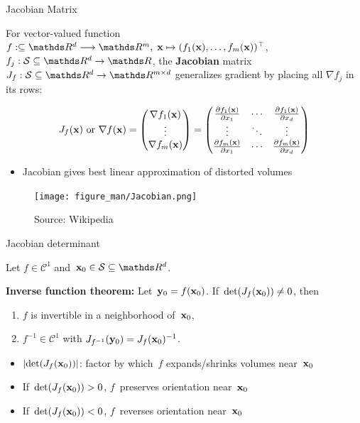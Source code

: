\documentclass[11pt,compress,t,notes=noshow, xcolor=table]{beamer}
\begin{document}
\begin{vbframe}{Jacobian Matrix}

For vector-valued function~$f:\subseteq \R^d\longrightarrow\R^m,\; \xv\mapsto(f_1(\xv),\dots,f_m(\xv))^\top$, $f_j:\mathcal{S}\subseteq \R^d\to\R$, the \textbf{Jacobian} matrix $J_f:\mathcal{S}\subseteq \R^d \to \R^{m\times d}$ generalizes gradient by placing all $\nabla f_j$ in its rows:

\begin{equation*}
    J_f(\mathbf{x}) \text{ or } \nabla f(\mathbf{x}) = \begin{pmatrix}
        \nabla f_1(\mathbf{x}) \\
        \vdots \\
        \nabla f_m(\mathbf{x})
	\end{pmatrix}
    =
    \begin{pmatrix}
        \frac{\partial f_1(\mathbf{x})}{\partial x_1} & \cdots & \frac{\partial f_1(\mathbf{x})}{\partial x_d} \\
        \vdots &  \ddots & \vdots \\
        \frac{\partial f_m(\mathbf{x})}{\partial x_1} & \cdots & \frac{\partial f_m(\mathbf{x})}{\partial x_d}
	\end{pmatrix}
\end{equation*}

\begin{itemize}
    \item Jacobian gives best linear approximation of distorted volumes
\end{itemize}

\begin{figure}
    \centering
    \texttt{[image: figure\_man/Jacobian.png]}
    \caption*{\footnotesize Source: Wikipedia}
\end{figure}

\end{vbframe}


\begin{vbframe}{Jacobian determinant}

Let $f\in\mathcal{C}^1$ and~$\xv_0\in\mathcal{S}\subseteq \R^d$.


\textbf{Inverse function theorem:} Let~$\mathbf{y}_0=f(\mathbf{x}_0)$.
    If~$\det(J_f(\mathbf{x}_0))\not=0$, then
    \begin{enumerate}
        \item $f$ is invertible in a neighborhood of~$\mathbf{x}_0$,
        \item $f^{-1}\in\mathcal{C}^1$ with $J_{f^{-1}}(\mathbf{y}_0) = J_f(\mathbf{x}_0)^{-1}$.
    \end{enumerate}


\begin{itemize}
    \item $|{\det(J_f(\mathbf{x}_0))}|$: factor by which~$f$ expands/shrinks volumes near~$\mathbf{x}_0$
    \item If~$\det(J_f(\mathbf{x}_0))>0$, $f$~preserves orientation near~$\mathbf{x}_0$
    \item If~$\det(J_f(\mathbf{x}_0))<0$, $f$~reverses orientation near~$\mathbf{x}_0$
\end{itemize}

\end{vbframe}
\end{document}
